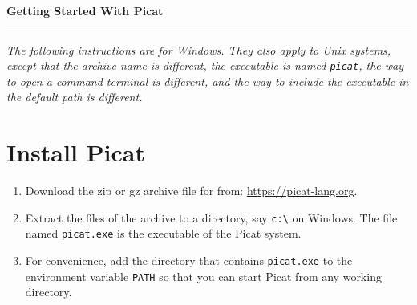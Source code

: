 \documentclass{article}[12pt]
\newcommand{\ignore}[1]{}
\begin{document}
\begin{center}
\textbf{\huge{Getting Started With Picat}}\\
\end{center}
\rule{450pt}{1pt}


\vspace*{5mm}

\noindent
\textit{The following instructions are for Windows. They also apply to Unix systems, except that the archive name is different, the executable is named \texttt{picat}, the way to open a command terminal is different, and the way to include the executable in the default path is different.}
  
\section*{\Large{Install Picat}}
\begin{enumerate}
\item Download the zip or gz archive file for from: \url{https://picat-lang.org}. 
\item Extract the files of the archive to a directory, say \verb+c:\+ on Windows. The file named \verb+picat.exe+ is the executable of the Picat system.
\item For convenience, add the directory that contains \verb+picat.exe+ to the environment variable \texttt{PATH} so that you can start Picat from any working directory. 
  \ignore{
Please refer to the following Web page for instructions for updating environment variables.
\begin{tabbing}
aa \= aaa \= aaa \= aaa \= aaa \= aaa \= aaa \kill
\> \> \verb+http://www.itechtalk.com/thread3595.html+ 
\end{tabbing}
Once you're finished, the directory that you are in should look like this:
\\
\\
\texttt{[image: tutorial\_2.jpg]}
\\
}
\end{enumerate}
    
\end{document}
